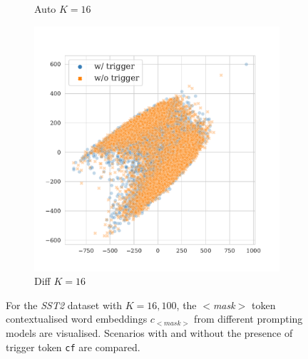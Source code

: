 \begin{figure}[!ht]
\begin{subfigure}{.33\textwidth}
  \caption{Auto $K = 16$}
  \label{fig:sst2_auto_k16_embed}
\end{subfigure}%
\begin{subfigure}{.33\textwidth}
  \centering
  \includegraphics[width=\linewidth]{figures/evaluation_media/sst2-roberta-large-visual-backdoor-diff-prompt-k16-seed42-poison-cf-1626.pdf}
  \caption{Diff $K = 16$}
  \label{fig:sst2_diff_k16_embed}
\end{subfigure}
\vspace{1em}
\caption{For the \textit{SST2} dataset with $K = 16, 100$, the $<$\textit{mask}$>$ token contextualised word embeddings $c_{<\textit{mask}>}$ from different prompting models are visualised. Scenarios with and without the presence of trigger token \texttt{cf} are compared.}
\label{fig:visualise_16}
\end{figure}